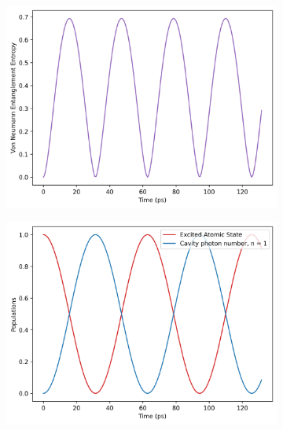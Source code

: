 \documentclass[12pt]{article}
\begin{document}
\begin{figure}[h]
    \centering
    \begin{subfigure}{0.45\textwidth}
        \centering
        \includegraphics[width=\linewidth]{Research Project/Code/results/JCM/CQS_vne.png}
        \caption{}
        \label{fig:JCM_cqs_vne_e0}
    \end{subfigure}
    \begin{subfigure}{0.45\textwidth}
        \centering
        \includegraphics[width=\linewidth]{Research Project/Code/results/JCM/CQS_expt.png}
        \caption{}
        \label{fig:JCM_cqs_xpt_e0}
    \end{subfigure}

        \vspace{0.5cm}
    

\end{figure}
\end{document}
